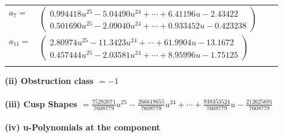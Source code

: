 \documentclass[1p]{elsarticle_modified}
\theoremstyle{definition}
\begin{document}
\begin{tabular}{m{7pt} m{180pt} m{7pt} m{180pt} }
\flushright $a_{7}=$&$\begin{pmatrix}0.994418 u^{25}-5.04490 u^{24}+\cdots+6.41196 u-2.43422\\0.501690 u^{25}-2.09040 u^{24}+\cdots+0.933452 u-0.423238\end{pmatrix}$ \\
\flushright $a_{11}=$&$\begin{pmatrix}2.80974 u^{25}-11.3423 u^{24}+\cdots+61.9904 u-13.1672\\0.457444 u^{25}-2.03581 u^{24}+\cdots+8.95996 u-1.75125\end{pmatrix}$\\&\end{tabular}
\flushleft \textbf{(ii) Obstruction class $= -1$}\\~\\
\flushleft \textbf{(iii) Cusp Shapes $= \frac{75282671}{7608779} u^{25}-\frac{266619655}{7608779} u^{24}+\cdots+\frac{938353524}{7608779} u-\frac{212625691}{7608779}$}\\~\\
\newpage\renewcommand{\arraystretch}{1}
\flushleft \textbf{(iv) u-Polynomials at the component}\newline \\
\end{document}
